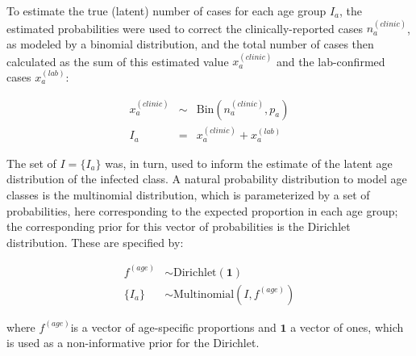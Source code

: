 To estimate the true (latent) number of cases for each age group \(I_a\), the estimated probabilities were used to correct the clinically-reported cases \(n_a^{(clinic)}\), as modeled by a binomial distribution, and the total number of cases then calculated as the sum of this estimated value \(x_a^{(clinic)}\) and the lab-confirmed cases \(x_a^{(lab)}\):

\begin{eqnarray}
x_a^{(clinic)} &\sim& \text{Bin}(n_a^{(clinic)},p_a) \\
I_a &=& x_a^{(clinic)}+x_a^{(lab)}
\end{eqnarray}

The set of \(I = \{I_a\}\) was, in turn, used to inform the estimate of the latent age distribution of the infected class. A natural probability distribution to model age classes is the multinomial distribution, which is parameterized by a set of probabilities, here corresponding to the expected proportion in each age group; the corresponding prior for this vector of probabilities is the  Dirichlet distribution. These are specified by:

\begin{equation}
\begin{aligned}
f^{(age)} &\sim \text{Dirichlet}(\mathbf{1}) \\
\{I_a\} &\sim \text{Multinomial}(I, f^{(age)})
\end{aligned}
\end{equation}

where \(f^{(age)}\)is a vector of age-specific proportions and \(\mathbf{1}\) a vector of ones, which is used as a non-informative prior for the Dirichlet.